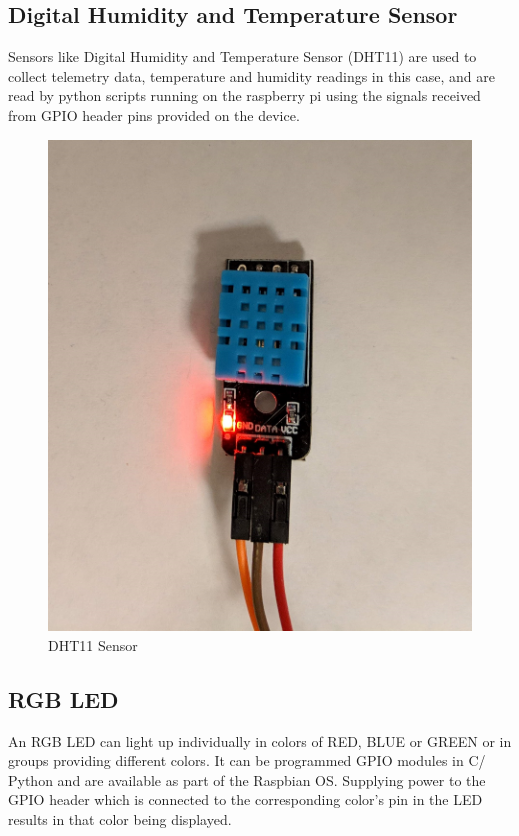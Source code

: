 \documentclass[11pt,openright]{report}
\begin{document}
\subsection{Digital Humidity and Temperature Sensor}
Sensors like Digital Humidity and Temperature Sensor (DHT11) are used to collect telemetry data, temperature and humidity readings in this case, and are read by python scripts running on the raspberry pi using the signals received from GPIO header pins provided on the device.

\begin{figure}
    \centering
    \includegraphics[scale=0.1]{images/dht11.jpg}
    \caption{DHT11 Sensor}
    \label{fig:dht11}
\end{figure}

\subsection{RGB LED}
An RGB LED can light up individually in colors of RED, BLUE or GREEN or in groups providing different colors. It can be programmed GPIO modules in C/ Python and are available as part of the Raspbian OS. Supplying power to the GPIO header which is connected to the corresponding color’s pin in the LED results in that color being displayed.
\end{document}
